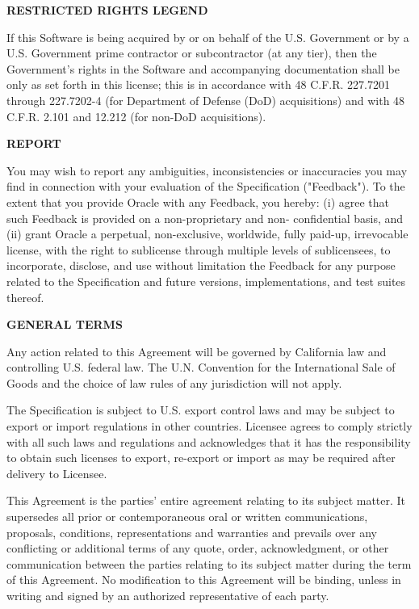 \begin{flushleft}
\vspace{1em}
{\bfseries RESTRICTED RIGHTS LEGEND}

If this Software is being acquired by or on behalf of the U.S. Government or by a U.S. Government prime contractor or subcontractor (at any tier), then the Government's rights in the Software and accompanying documentation shall be only as set forth in this license; this is in accordance with 48 C.F.R. 227.7201 through 227.7202-4 (for Department of Defense (DoD) acquisitions) and with 48 C.F.R. 2.101 and 12.212 (for non-DoD acquisitions).

\vspace{1em}
{\bfseries REPORT}

You may wish to report any ambiguities, inconsistencies or inaccuracies you may find in connection with your evaluation of the Specification ("Feedback"). To the extent that you provide Oracle with any Feedback, you hereby: (i) agree that such Feedback is provided on a non-proprietary and non- confidential basis, and (ii) grant Oracle a perpetual, non-exclusive, worldwide, fully paid-up, irrevocable license, with the right to sublicense through multiple levels of sublicensees, to incorporate, disclose, and use without limitation the Feedback for any purpose related to the Specification and future versions, implementations, and test suites thereof.

\vspace{1em}
{\bfseries GENERAL TERMS}

Any action related to this Agreement will be governed by California law and controlling U.S. federal law. The U.N. Convention for the International Sale of Goods and the choice of law rules of any jurisdiction will not apply.

The Specification is subject to U.S. export control laws and may be subject to export or import regulations in other countries. Licensee agrees to comply strictly with all such laws and regulations and acknowledges that it has the responsibility to obtain such licenses to export, re-export or import as may be required after delivery to Licensee.

This Agreement is the parties' entire agreement relating to its subject matter. It supersedes all prior or contemporaneous oral or written communications, proposals, conditions, representations and warranties and prevails over any conflicting or additional terms of any quote, order, acknowledgment, or other communication between the parties relating to its subject matter during the term of this Agreement. No modification to this Agreement will be binding, unless in writing and signed by an authorized representative of each party.

\end{flushleft}